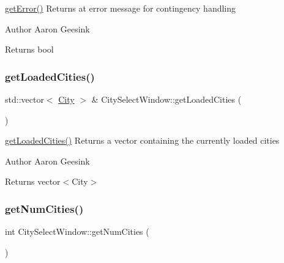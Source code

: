 \mbox{\hyperlink{class_city_select_window_a44f594818e36ca35519eaf67c9e9a360}{get\+Error()}} Returns at error message for contingency handling 

\begin{DoxyAuthor}{Author}
Aaron Geesink 
\end{DoxyAuthor}
\begin{DoxyReturn}{Returns}
bool 
\end{DoxyReturn}
\mbox{\label{class_city_select_window_a7a0aacdfc7b496f7b21cba7ab6311468}} 
\subsubsection{\texorpdfstring{getLoadedCities()}{getLoadedCities()}}
{\footnotesize\ttfamily std\+::vector$<$ \mbox{\hyperlink{class_city}{City}} $>$ \& City\+Select\+Window\+::get\+Loaded\+Cities (\begin{DoxyParamCaption}{ }\end{DoxyParamCaption})}



\mbox{\hyperlink{class_city_select_window_a7a0aacdfc7b496f7b21cba7ab6311468}{get\+Loaded\+Cities()}} Returns a vector containing the currently loaded cities 

\begin{DoxyAuthor}{Author}
Aaron Geesink 
\end{DoxyAuthor}
\begin{DoxyReturn}{Returns}
vector$<$\+City$>$ 
\end{DoxyReturn}
\mbox{\label{class_city_select_window_a2bee3e628f1249dd6fa5cabc08d63f43}} 
\subsubsection{\texorpdfstring{getNumCities()}{getNumCities()}}
{\footnotesize\ttfamily int City\+Select\+Window\+::get\+Num\+Cities (\begin{DoxyParamCaption}{ }\end{DoxyParamCaption})}




